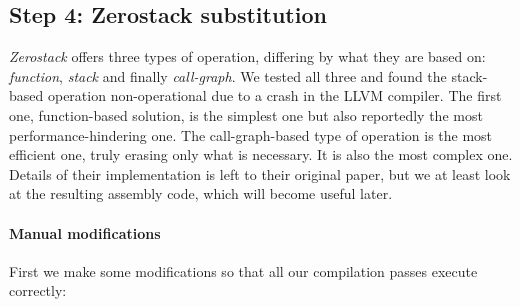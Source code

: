 \documentclass[a4paper,10pt,openright]{memoir}
\newcommand{\term}[1]{\textit{#1}}
\begin{document}
\subsection{Step 4: Zerostack substitution}

\term{Zerostack} offers three types of operation, differing by what 
they are based on: \term{function}, \term{stack} and finally 
\term{call-graph}. We tested all three and found the stack-based 
operation non-operational due to a crash in the LLVM compiler. The 
first one, function-based solution, is the simplest one but also 
reportedly\cite{whatyouc} the most performance-hindering one. The 
call-graph-based type of operation is the most efficient one, truly 
erasing only what is necessary. It is also the most complex one. 
Details of their implementation is left to their original 
paper\cite{whatyouc}, but we at least look at the resulting assembly 
code, which will become useful later.

\paragraph{Manual modifications}

First we make some modifications so that all our compilation passes 
execute correctly:
\end{document}
